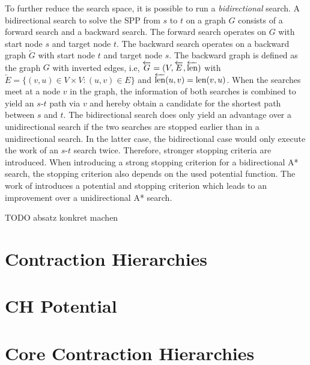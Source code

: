 To further reduce the search space, it is possible to run a \emph{bidirectional} search. A bidirectional search to solve the SPP from $s$ to $t$ on a graph $G$ consists of a forward search and a backward search. The forward search operates on $G$ with start node $s$ and target node $t$. The backward search operates on a backward graph $\overleftarrow{G}$ with start node $t$ and target node $s$. The backward graph is defined as the graph $G$ with inverted edges, i.e, $\overleftarrow{G} = (V,\overleftarrow{E},\overleftarrow{\operatorname{len}})$ with $\overleftarrow{E} = \{(v,u) \in V \times V \colon (u,v) \in E\}$ and $\overleftarrow{\operatorname{len}}(u,v) = \operatorname{len}(v,u)$. When the searches meet at a node $v$ in the graph, the information of both searches is combined to yield an $s$-$t$ path via $v$ and hereby obtain a candidate for the shortest path between $s$ and $t$. The bidirectional search does only yield an advantage over a unidirectional search if the two searches are stopped earlier than in a unidirectional search. In the latter case, the bidirectional case would only execute the work of an $s$-$t$ search twice. Therefore, stronger stopping criteria are introduced. When introducing a strong stopping criterion for a bidirectional A* search, the stopping criterion also depends on the used potential function. The work of \cite{goldberg:2005} introduces a potential and stopping criterion which leads to an improvement over a unidirectional A* search.

TODO absatz konkret machen

\section{Contraction Hierarchies}
\label{sec:ch}
\section{CH Potential\label{sec:ch_pot}}
\section{Core Contraction Hierarchies}